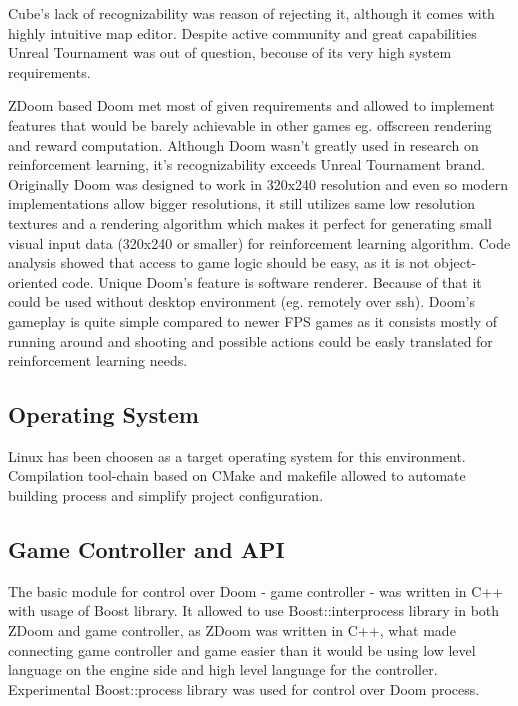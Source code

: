 \addtocounter{footnote}{-2}
Cube's lack of recognizability was reason of rejecting it, although it comes with highly intuitive map editor.
Despite active community and great capabilities Unreal Tournament was out of question, becouse of its very high system requirements.




ZDoom based Doom met most of given requirements and allowed to implement features that would be barely achievable in other games eg. offscreen rendering and reward computation.
Although Doom wasn't greatly used in research on reinforcement learning, it's recognizability exceeds Unreal Tournament brand.
Originally Doom was designed to work in 320x240 resolution and even so modern implementations allow bigger resolutions, it still utilizes same low resolution textures and a rendering algorithm which makes it perfect for generating small visual input data (320x240 or smaller) for reinforcement learning algorithm.
Code analysis showed that access to game logic should be easy, as it is not object-oriented code.
Unique Doom's feature is software renderer. Because of that it could be used without desktop environment (eg. remotely over ssh).
Doom's gameplay is quite simple compared to newer FPS games as it consists mostly of running around and shooting and possible actions could be easly translated for reinforcement learning needs. 






\subsection{Operating System}


Linux has been choosen as a target operating system for this environment.
Compilation tool-chain based on CMake and makefile allowed to automate building process and simplify project configuration.



\subsection{Game Controller and API}


The basic module for control over Doom - game controller - was written in C++ with usage of Boost library.
It allowed to use Boost::interprocess library in both ZDoom and game controller, as ZDoom was written in C++, what made connecting game controller and game easier than it would be using low level language on the engine side and high level language for the controller.
Experimental Boost::process library was used for control over Doom process.


